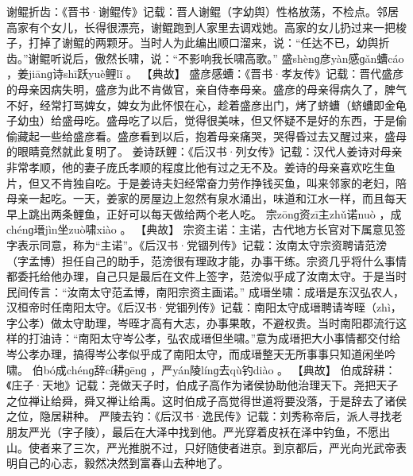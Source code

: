 \documentclass[12pt,UTF8]{ctexbook}
\begin{document}
谢鲲折齿：《晋书·谢鲲传》记载：晋人谢鲲（字幼舆）性格放荡，不检点。邻居高家有个女儿，长得很漂亮，谢鲲跑到人家里去调戏她。高家的女儿扔过来一把梭子，打掉了谢鲲的两颗牙。当时人为此编出顺口溜来，说：“任达不已，幼舆折齿。”谢鲲听说后，傲然长啸，说：“不影响我长啸高歌。”
盛shènɡ彦yàn感ɡǎn螬cáo
，姜jiānɡ诗shī跃yuè鲤lǐ
。
【典故】
盛彦感螬：《晋书·孝友传》记载：晋代盛彦的母亲因病失明，盛彦为此不肯做官，亲自侍奉母亲。盛彦的母亲得病久了，脾气不好，经常打骂婢女，婢女为此怀恨在心，趁着盛彦出门，烤了蛴螬（蛴螬即金龟子幼虫）给盛母吃。盛母吃了以后，觉得很美味，但又怀疑不是好的东西，于是偷偷藏起一些给盛彦看。盛彦看到以后，抱着母亲痛哭，哭得昏过去又醒过来，盛母的眼睛竟然就此复明了。
姜诗跃鲤：《后汉书·列女传》记载：汉代人姜诗对母亲非常孝顺，他的妻子庞氏孝顺的程度比他有过之无不及。姜诗的母亲喜欢吃生鱼片，但又不肯独自吃。于是姜诗夫妇经常奋力劳作挣钱买鱼，叫来邻家的老妇，陪母亲一起吃。一天，姜家的房屋边上忽然有泉水涌出，味道和江水一样，而且每天早上跳出两条鲤鱼，正好可以每天做给两个老人吃。
宗zōnɡ资zī主zhǔ诺nuò
，成chénɡ瑨jìn坐zuò啸xiào
。
【典故】
宗资主诺：主诺，古代地方长官对下属意见签字表示同意，称为“主诺”。《后汉书·党锢列传》记载：汝南太守宗资聘请范滂（字孟博）担任自己的助手，范滂很有理政才能，办事干练。宗资几乎将什么事情都委托给他办理，自己只是最后在文件上签字，范滂似乎成了汝南太守。于是当时民间传言：“汝南太守范孟博，南阳宗资主画诺。”
成瑨坐啸：成瑨是东汉弘农人，汉桓帝时任南阳太守。《后汉书·党锢列传》记载：南阳太守成瑨聘请岑晊（zhì，字公孝）做太守助理，岑晊才高有大志，办事果敢，不避权贵。当时南阳郡流行这样的打油诗：“南阳太守岑公孝，弘农成瑨但坐啸。”意为成瑨把大小事情都交付给岑公孝办理，搞得岑公孝似乎成了南阳太守，而成瑨整天无所事事只知道闲坐吟啸。
伯bó成chénɡ辞cí耕ɡēnɡ
，严yán陵línɡ去qù钓diào
。
【典故】
伯成辞耕：《庄子·天地》记载：尧做天子时，伯成子高作为诸侯协助他治理天下。尧把天子之位禅让给舜，舜又禅让给禹。这时伯成子高觉得世道将要没落，于是辞去了诸侯之位，隐居耕种。
严陵去钓：《后汉书·逸民传》记载：刘秀称帝后，派人寻找老朋友严光（字子陵），最后在大泽中找到他。严光穿着皮袄在泽中钓鱼，不愿出山。使者来了三次，严光推脱不过，只好随使者进京。到京都后，严光向光武帝表明自己的心志，毅然决然到富春山去种地了。
\end{document}
